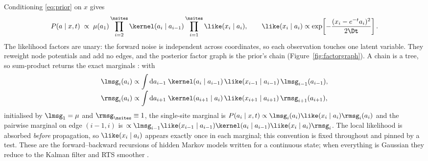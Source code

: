 \documentclass{article}
\begin{document}
Conditioning \eqref{eq:prior} on $x$ gives
\begin{equation}
\label{eq:posterior}
P(a \mid x,t) \;\propto\;
\mu(a_1)\prod_{i=2}^{\nsites} \kernel(a_i\mid a_{i-1})
\prod_{i=1}^{\nsites} \like(x_i \mid a_i),
\qquad
\like(x_i\mid a_i) \propto \exp\!\left[-\frac{(x_i - e^{-t}a_i)^2}{2\Dt}\right].
\end{equation}
The likelihood factors are unary: the forward noise is independent across coordinates, so each
observation touches one latent variable. They reweight node potentials and add no edges, and the
posterior factor graph is the prior's chain (Figure~\ref{fig:factorgraph}). A chain is a tree,
so sum-product returns the exact marginals \citep{pearl1988,kschischang2001,mezard2009}: with
\begin{align}
\label{eq:messages}
\lmsg_{i}(a_i) &\propto \int \mathrm{d}a_{i-1}\;
\kernel(a_i\mid a_{i-1})\,\like(x_{i-1}\mid a_{i-1})\,\lmsg_{i-1}(a_{i-1}), \nonumber\\[-2pt]
\rmsg_{i}(a_i) &\propto \int \mathrm{d}a_{i+1}\;
\kernel(a_{i+1}\mid a_i)\,\like(x_{i+1}\mid a_{i+1})\,\rmsg_{i+1}(a_{i+1}),
\end{align}
initialised by $\lmsg_1 = \mu$ and $\rmsg_{\nsites}\equiv 1$, the single-site marginal is
$P(a_i\mid x,t) \propto \lmsg_i(a_i)\like(x_i\mid a_i)\rmsg_i(a_i)$ and the pairwise marginal on
edge $(i-1,i)$ is $\propto \lmsg_{i-1}\like(x_{i-1}\mid a_{i-1})\kernel(a_i\mid
a_{i-1})\like(x_i\mid a_i)\rmsg_i$. The local likelihood is absorbed \emph{before} propagation,
so $\like(x_i\mid a_i)$ appears exactly once in each marginal; this convention is fixed
throughout and pinned by a test. These are the forward--backward recursions of hidden Markov
models \citep{baum1970,rabiner1989} written for a continuous state; when everything is Gaussian
they reduce to the Kalman filter and RTS smoother \citep{kalman1960,rauch1965}.
\end{document}
